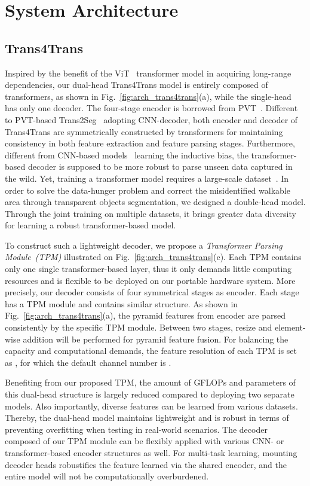 \documentclass[10pt,twocolumn,letterpaper]{article}
\begin{document}
\section{System Architecture}


\subsection{Trans4Trans}
Inspired by the benefit of the ViT~\cite{vit} transformer model in acquiring long-range dependencies, our dual-head Trans4Trans model is entirely composed of transformers, as shown in Fig.~\ref{fig:arch_trans4trans}(a), while the single-head has only one decoder. The four-stage encoder is borrowed from PVT~\cite{pvt}.
Different to PVT-based Trans2Seg~\cite{xie2021segmenting} adopting CNN-decoder, both encoder and decoder of Trans4Trans are symmetrically constructed by transformers for maintaining consistency in both feature extraction and feature parsing stages. Furthermore, different from CNN-based models~\cite{espnetv2,fastscnn,bisenet,ocnet} learning the inductive bias, the transformer-based decoder is supposed to be more robust to parse unseen data captured in the wild. Yet, training a transformer model requires a large-scale dataset~\cite{vit}. In order to solve the data-hunger problem and correct the misidentified walkable area through transparent objects segmentation, we designed a double-head model. Through the joint training on multiple datasets, it brings greater data diversity for learning a robust transformer-based model.

To construct such a lightweight decoder, we propose a \emph{Transformer Parsing Module~(TPM)} illustrated on Fig.~\ref{fig:arch_trans4trans}(c). Each TPM contains only one single transformer-based layer, thus it only demands little computing resources and is flexible to be deployed on our portable hardware system. More precisely, our decoder consists of four symmetrical stages as encoder. Each stage has a TPM module and contains similar structure. As shown in Fig.~\ref{fig:arch_trans4trans}(a), the pyramid features  from encoder are parsed consistently by the specific TPM module. Between two stages, resize and element-wise addition will be performed for pyramid feature fusion. For balancing the capacity and computational demands, the feature resolution of each TPM is set as , for which the default channel number is .

Benefiting from our proposed TPM, the amount of GFLOPs and parameters of this dual-head structure is largely reduced compared to deploying two separate models. Also importantly, diverse features can be learned from various datasets. Thereby, the dual-head model maintains lightweight and is robust in terms of preventing overfitting when testing in real-world scenarios. The decoder composed of our TPM module can be flexibly applied with various CNN- or transformer-based encoder structures as well. For multi-task learning, mounting decoder heads robustifies the feature learned via the shared encoder, and the entire model will not be computationally overburdened.
\end{document}
